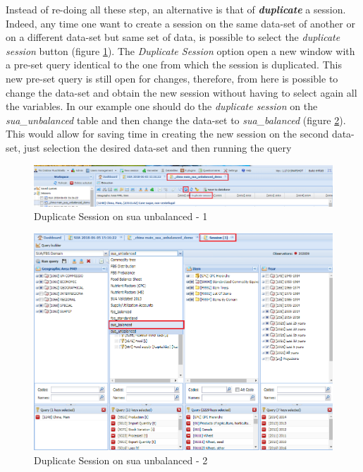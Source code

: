 \documentclass[]{article}
\begin{document}
Instead of re-doing all these step, an alternative is that of
\textbf{\emph{duplicate}} a session. Indeed, any time one want to create
a session on the same data-set of another or on a different data-set but
same set of data, is possible to select the \emph{duplicate session}
button (figure \ref{fig:f18}). The \emph{Duplicate Session} option open
a new window with a pre-set query identical to the one from which the
session is duplicated. This new pre-set query is still open for changes,
therefore, from here is possible to change the data-set and obtain the
new session without having to select again all the variables. In our
example one should do the \emph{duplicate session} on the
\emph{sua\_unbalanced} table and then change the data-set to
\emph{sua\_balanced} (figure \ref{fig:f19}). This would allow for saving
time in creating the new session on the second data-set, just selection
the desired data-set and then running the query

\begin{figure}[H]

{\centering \includegraphics[width=1\linewidth]{images/standPlugin/18_duplicateSession} 

}

\caption{\label{fig:f18}Duplicate Session on sua unbalanced - 1}\label{fig:f18}
\end{figure}

\begin{figure}[H]

{\centering \includegraphics[width=1\linewidth]{images/standPlugin/19_duplicateSession2} 

}

\caption{\label{fig:f19}Duplicate Session on sua unbalanced - 2}\label{fig:f19}
\end{figure}
\end{document}
